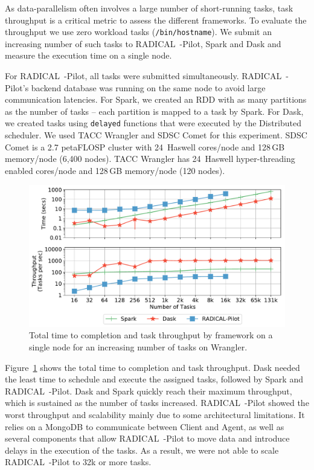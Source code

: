 As data-parallelism often involves a large number of short-running tasks, task throughput is a critical metric to assess the different frameworks.
To evaluate the throughput we use zero workload tasks (\texttt{/bin/hostname}).
We submit an increasing number of such tasks to RADICAL~-Pilot, Spark and Dask and measure the execution time on a single node.

For RADICAL~-Pilot, all tasks were submitted simultaneously. 
RADICAL~-Pilot's backend database was running on the same node to avoid large communication latencies.
For Spark, we created an RDD with as many partitions as the number of tasks -- each partition is mapped to a task by Spark.
For Dask, we created tasks using \texttt{delayed} functions that were executed by the Distributed scheduler.
We used TACC Wrangler and SDSC Comet for this experiment.
SDSC Comet is a 2.7 petaFLOSP cluster with 24\, Haswell cores/node and 128\,GB memory/node (6,400 nodes).
TACC Wrangler has 24\, Haswell hyper-threading enabled cores/node and 128\,GB memory/node (120 nodes).


\begin{figure}[t]
    \centering
    \includegraphics[width=.85\textwidth]{figures/data_analytics_hpc/task_par/dask_spark_rp_wrangler.pdf}
    \caption{Total time to completion and task throughput by framework on a single node for an increasing number of tasks on Wrangler.}
    \label{fig:dask_spark_rp_wrangler}
\end{figure}

Figure~\ref{fig:dask_spark_rp_wrangler} shows the total time to completion and task throughput.
Dask needed the least time to schedule and execute the assigned tasks, followed by Spark and RADICAL~-Pilot.
Dask and Spark quickly reach their maximum throughput, which is sustained as the number of tasks increased.
RADICAL~-Pilot showed the worst throughput and scalability mainly due to some architectural limitations.
It relies on a MongoDB to communicate between Client and Agent, as well as several components that allow RADICAL~-Pilot to move data and introduce delays in the execution of the tasks.
As a result, we were not able to scale RADICAL~-Pilot to 32k or more tasks.

